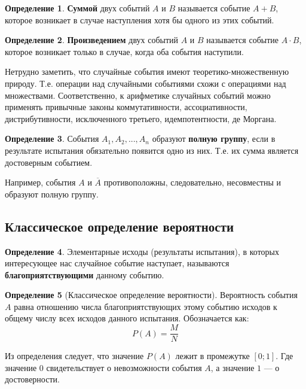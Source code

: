 \documentclass[12pt,a4paper]{article}
\theoremstyle{definition}
\newtheorem{definition}{Определение}[section]
\theoremstyle{definition}
\theoremstyle{remark}
\theoremstyle{corollary}
\theoremstyle{bolditalic}
\begin{document}
\begin{definition}
    \textbf{Суммой} двух событий $A$ и $B$ называется событие $A+B$, которое возникает в случае наступления хотя бы одного из этих событий.
\end{definition}

\begin{definition}
    \textbf{Произведением} двух событий $A$ и $B$ называется событие $A\cdot B$, которое возникает только в случае, когда оба события наступили.
 \end{definition}

 Нетрудно заметить, что случайные события имеют теоретико-множественную природу. Т.е. операции над случайными событиями схожи с операциями над множествами. Соответственно, к арифметике случайных событий можно применять привычные законы коммутативности, ассоциативности, дистрибутивности, исключенного третьего, идемпотентности, де Моргана.

\begin{definition}
    События $A_1, A_2, ..., A_n$ образуют \textbf{полную группу}, если в результате испытания обязательно появится одно из них. Т.е. их сумма является достоверным событием.
\end{definition}

Например, события $A$ и $\overline{A}$ противоположны, следовательно, несовместны и образуют полную группу.

\subsection{Классическое определение вероятности}

\begin{definition}
    Элементарные исходы (результаты испытания), в которых интересующее нас случайное событие наступает, называются \textbf{благоприятствующими} данному событию.
\end{definition}

\begin{definition}[Классическое определение вероятности]
    Вероятность события $A$ равна отношению числа благоприятствующих этому событию исходов к общему числу всех исходов данного испытания. Обозначается как:
\[
P(A)=\frac{M}{N}
\]
\end{definition}

Из определения следует, что значение $P(A)$ лежит в промежутке $[0; 1]$. Где значение $0$ свидетельствует о невозможности события $A$, а значение $1$ --- о достоверности.
\end{document}
